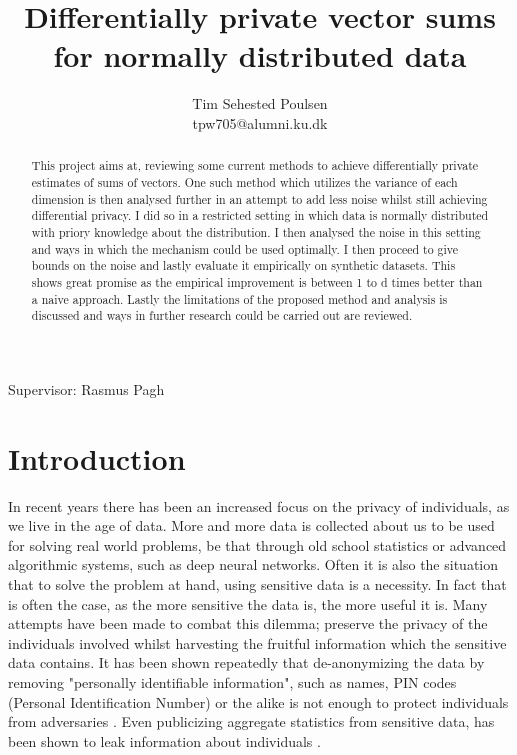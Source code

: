 \documentclass[a4paper,12pt]{article}
\title{\textbf{Differentially private vector sums for normally distributed data}}
\author{Tim Sehested Poulsen \\ tpw705@alumni.ku.dk}
\begin{document}
\maketitle
\begin{center}
Supervisor: Rasmus Pagh
\end{center}
\begin{figure}[b]
\end{figure}
\newpage
\begin{abstract}
This project aims at, reviewing some current methods to achieve differentially private estimates
of sums of vectors. One such method which utilizes the variance of each dimension
is then analysed further in an attempt to add less noise whilst still achieving differential privacy.
I did so in a restricted setting in which data is normally distributed with 
priory knowledge about the distribution. I then analysed the 
noise in this setting and ways in which the mechanism could be used optimally.
I then proceed to give bounds on the noise and lastly evaluate it empirically on
synthetic datasets. This shows great promise as the empirical improvement is between 1 to d times better than a naive approach.
Lastly the limitations of the proposed method and analysis is discussed and ways in
further research could be carried out are reviewed. 
\end{abstract}
\newpage

\tableofcontents

\newpage
\section{Introduction}
In recent years there has been an increased focus on the privacy of individuals, as we live in the age of data.
More and more data is collected about us to be used for solving real world problems, be that through old school statistics or
advanced algorithmic systems, such as deep neural networks.
Often it is also the situation that to solve the problem at hand, using sensitive data is a necessity.
In fact that is often the case, as the more sensitive the data is, the more useful it is.
Many attempts have been made to combat this dilemma; preserve the privacy of the individuals involved whilst harvesting the
fruitful information which the sensitive data contains.
It has been shown repeatedly that de-anonymizing the data by removing "personally identifiable information", such as names, PIN codes (Personal Identification Number) or the alike is not enough
to protect individuals from adversaries \cite{medical,netflix}.
Even publicizing aggregate statistics from sensitive data, has been shown to leak information about individuals \cite{exposed}.
\end{document}
